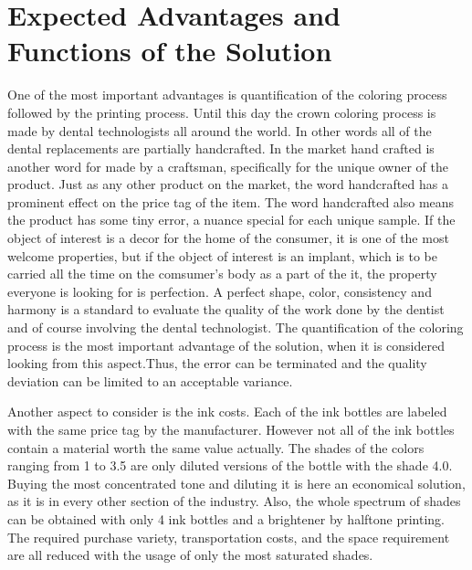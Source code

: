  

\chapter{Expected Advantages and Functions of the Solution}
One of the most important advantages is quantification of the coloring process followed by the printing process. Until this day the crown coloring process is made by dental technologists all around the world. In other words all of the dental replacements are partially handcrafted. In the market hand crafted is another word for made by a craftsman, specifically for the unique owner of the product. Just as any other product on the market, the word handcrafted has a prominent effect on the price tag of the item. The word handcrafted also means the product has some tiny error, a nuance special for each unique sample. If the object of interest is a decor for the home of the consumer, it is one of the most welcome properties, but if the object of interest is an implant, which is to be carried all the time on the comsumer's body as a part of the it, the property everyone is looking for is perfection. A perfect shape, color, consistency and harmony is a standard to evaluate the quality of the work done by the dentist and of course involving the dental technologist. The quantification of the coloring process is the most important advantage of the solution, when it is considered looking from this aspect.Thus, the error can be terminated and the quality deviation can be limited to an acceptable variance. 

Another aspect to consider is the ink costs. Each of the ink bottles are labeled with the same price tag by the manufacturer. However not all of the ink bottles contain a material worth the same value actually. The shades of the colors ranging from 1 to 3.5 are only diluted versions of the bottle with the shade 4.0. Buying the most concentrated tone and diluting it is here an economical solution, as it is in every other section of the industry. Also, the whole spectrum of shades can be obtained with only 4 ink bottles and a brightener by halftone printing. The required purchase variety, transportation costs, and the space requirement are all reduced with the usage of only the most saturated shades.

